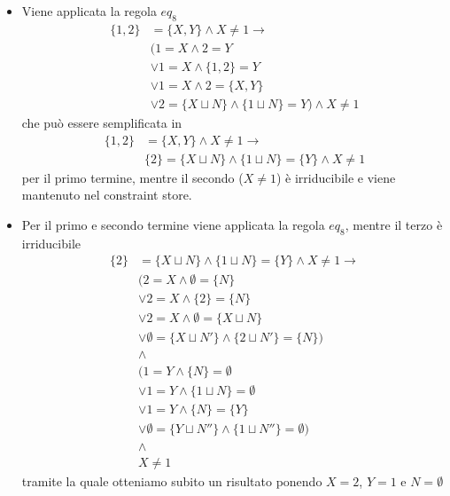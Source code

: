 \documentclass[12pt,a4paper,openright]{book}  %
\begin{document}
\begin{itemize}
	\item Viene applicata la regola $eq_8$\\ 
	  \[
	  \begin{split}
	    \{ 1, 2 \} &= \{ X, Y \} \land X \neq 1 \to \\
	      & (1 = X \land 2 = Y \\
	      & \lor 1 = X \land \{ 1,2 \} = Y \\
	      & \lor 1 = X \land 2 = \{ X,Y \} \\
	      & \lor 2 = \{ X \sqcup N \} \land \{ 1 \sqcup N \} = Y)  \land X \neq 1
	  \end{split}
	  \]
	  che può essere semplificata in 
	  \[
	    \begin{split}
	      \{ 1, 2 \} &= \{ X, Y \} \land X \neq 1 \to \\
	  	    & \{2\} = \{ X \sqcup N \} \land \{ 1 \sqcup N \} = \{Y\}  \land X \neq 1
        \end{split}
	  \]
	  per il primo termine, mentre il secondo ($X \neq 1$) è irriducibile e viene mantenuto nel constraint store.
	\item Per il primo e secondo termine viene applicata la regola $eq_8$, mentre il terzo è irriducibile
	  \[
	    \begin{split}
	      \{2\} &= \{ X \sqcup N \} \land \{ 1 \sqcup N \} = \{Y\}  \land X \neq 1 \to \\
	        & (2=X \land \emptyset=\{N\} \\
	        & \lor 2=X \land \{2\}=\{N\} \\
	        & \lor 2=X \land \emptyset = \{ X \sqcup N \} \\
	        & \lor \emptyset = \{X \sqcup N'\} \land \{ 2 \sqcup N'\} = \{ N\}) \\
	        & \land \\
	        & (1=Y \land \{N\} = \emptyset \\
	        & \lor 1=Y \land \{1 \sqcup N\} = \emptyset \\
	        & \lor 1=Y \land \{N\} = \{Y\} \\
	        & \lor \emptyset = \{Y \sqcup N'' \} \land \{1 \sqcup N''\} = \emptyset) \\
	        & \land \\ 
	        & X \neq 1
	    \end{split}
	  \]
	  tramite la quale otteniamo subito un risultato ponendo $X=2$, $Y=1$ e $N=\emptyset$
\end{itemize}
\end{document}
